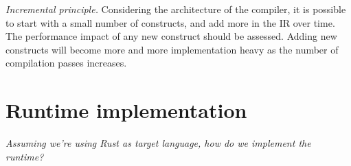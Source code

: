 \documentclass[10pt,a4paper]{article}
\begin{document}
\textit{Incremental principle.}
Considering the architecture of the compiler, it is possible to start with a small number of constructs, and add more in the IR over time.
The performance impact of any new construct should be assessed.
Adding new constructs will become more and more implementation heavy as the number of compilation passes increases.

\section{Runtime implementation}

\textit{Assuming we're using Rust as target language, how do we implement the runtime?}
\end{document}
